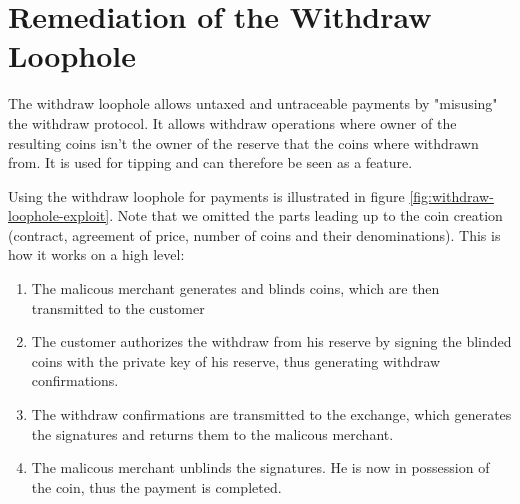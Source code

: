 \section{Remediation of the Withdraw Loophole}
The withdraw loophole allows untaxed and untraceable payments by "misusing" the withdraw protocol.
It allows withdraw operations where owner of the resulting coins isn't the owner of the reserve that the coins where withdrawn from.
It is used for tipping and can therefore be seen as a feature.

Using the withdraw loophole for payments is illustrated in figure \ref{fig:withdraw-loophole-exploit}.
Note that we omitted the parts leading up to the coin creation (contract, agreement of price, number of coins and their denominations).
This is how it works on a high level:
\begin{enumerate}
    \item The malicous merchant generates and blinds coins, which are then transmitted to the customer
    \item The customer authorizes the withdraw from his reserve by signing the blinded coins with the private key of his reserve, thus generating withdraw confirmations.
    \item The withdraw confirmations are transmitted to the exchange, which generates the signatures and returns them to the malicous merchant.
    \item The malicous merchant unblinds the signatures.
    He is now in possession of the coin, thus the payment is completed.
\end{enumerate}

